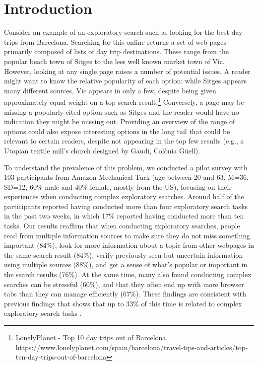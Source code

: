 \section{Introduction}

Consider an example of an exploratory search such as looking for the best day trips from Barcelona. Searching for this online returns a set of web pages primarily composed of lists of day trip destinations. These range from the popular beach town of Sitges to the less well known market town of Vic. However, looking at any single page raises a number of potential issues. A reader might want to know the relative popularity of each option: while Sitges appears many different sources, Vic appears in only a few, despite being given approximately equal weight on a top search result.\footnote{LonelyPlanet - Top 10 day trips out of Barcelona,  https://www.lonelyplanet.com/spain/barcelona/travel-tips-and-articles/top-ten-day-trips-out-of-barcelona} Conversely, a page may be missing a popularly cited option such as Sitges and the reader would have no indication they might be missing out.  Providing an overview of the range of options could also expose interesting options in the long tail that could be relevant to certain readers, despite not appearing in the top few results (e.g., a Utopian textile mill's church designed by Gaudi, Col\`onia G\"uell).  

To understand the prevalence of this problem, we conducted a pilot survey with 103 participants from Amazon Mechanical Turk (age between 20 and 63, M=36, SD=12, 60\% male and 40\% female, mostly from the US), focusing on their experiences when conducting complex exploratory searches. Around half of the participants reported having conducted more than four exploratory search tasks in the past two weeks, in which 17\% reported having conducted more than ten tasks. Our results reaffirm that 
when conducting exploratory searches, people read from multiple information sources to make sure they do not miss something important (84\%), look for more information about a topic from other webpages in the same search result (84\%), verify previously seen but uncertain information using multiple sources (88\%),
and get a sense of what's popular or important in the search results (76\%).
At the same time, many also found conducting complex searches can be stressful (60\%), and that they often end up with more browser tabs than they can manage efficiently (67\%). These findings are consistent with previous findings that shows that up to 33\% of this time is related to complex exploratory search tasks \cite{mar2006exp,kellar2007field,rose2004understanding}.



